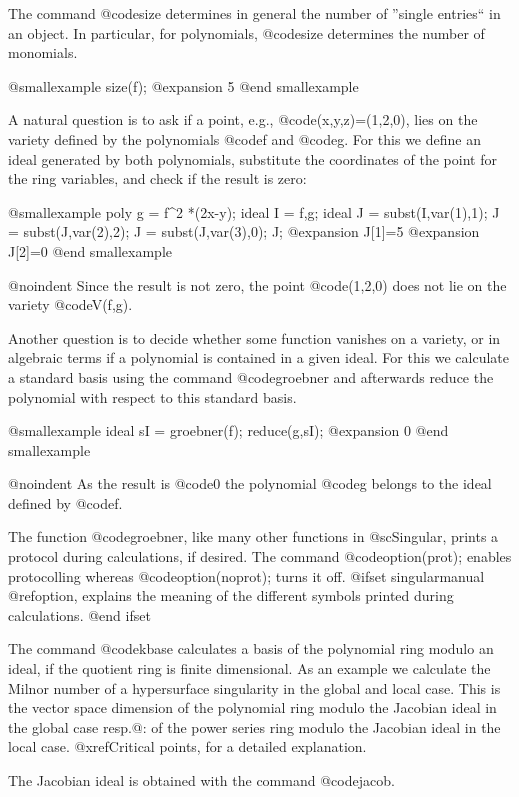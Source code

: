 The command @code{size} determines in general the number of ''single
entries`` in an object. In particular, for polynomials, @code{size}
determines the number of monomials.

@smallexample
size(f);
@expansion{} 5
@end smallexample

A natural question is to ask if a point, e.g., @code{(x,y,z)=(1,2,0)}, lies
on the variety defined by the polynomials @code{f} and @code{g}. For
this we define an ideal generated by both polynomials, substitute the
coordinates of the point for the ring variables, and check if the result
is zero:

@smallexample
poly g =  f^2 *(2x-y);
ideal I = f,g;
ideal J = subst(I,var(1),1);
J = subst(J,var(2),2);
J = subst(J,var(3),0);
J;
@expansion{} J[1]=5
@expansion{} J[2]=0
@end smallexample

@noindent Since the result is not zero, the point @code{(1,2,0)} does
not lie on the variety @code{V(f,g)}.

Another question is to decide whether some function vanishes on a
variety, or in algebraic terms if a polynomial is contained in a given
ideal. For this we calculate a standard basis using the command
@code{groebner} and afterwards reduce the polynomial with respect to
this standard basis.

@smallexample
ideal sI = groebner(f);
reduce(g,sI);
@expansion{} 0
@end smallexample

@noindent As the result is @code{0} the polynomial @code{g} belongs to the
ideal defined by @code{f}.

The function @code{groebner}, like many other functions in
@sc{Singular}, prints a protocol during calculations, if desired. The
command @code{option(prot);} enables protocolling whereas
@code{option(noprot);} turns it off.
@ifset singularmanual
@ref{option}, explains the meaning
of the different symbols printed during calculations.
@end ifset

The command @code{kbase} calculates a basis of the polynomial ring
modulo an ideal, if the quotient ring is finite dimensional.
As an example we calculate the Milnor number of a
hypersurface singularity in the global and local case. This is the
vector space dimension of the polynomial ring modulo the Jacobian ideal
in the global case resp.@: of the power series ring modulo the Jacobian
ideal in the local case. @xref{Critical points}, for a detailed
explanation.

The Jacobian ideal is obtained with the command @code{jacob}.

